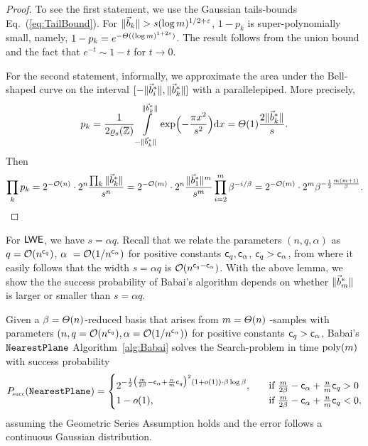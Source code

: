 \begin{proof}
	To see the first statement, we use the Gaussian tails-bounds Eq.~(\ref{eq:TailBound}). For $\| \vec b_k \| > s (\log{m})^{1/2 + \varepsilon}$, $1-p_k$ is super-polynomially small, namely, $1-p_k = e^{-\varTheta((\log{m})^{1+2\varepsilon})}$. The result follows from the union bound and the fact that $e^{-t} \sim 1-t$ for $t \rightarrow 0$. 
	
	For the second statement, informally, we approximate the area under the Bell-shaped curve on the interval $[- \| \vec b^*_i \|, \| \vec b^*_k \|]$ with a parallelepiped. More precisely,
	\[
		p_k = \frac{1}{2 \varrho_s({{\mathbb Z}})}\int\limits_{- \| \vec b^*_k \|}^{ \| \vec b^*_k \|} \exp \Bigl(-\frac{\pi x^2}{s^2} \Bigr) \mathrm{d} x = \varTheta(1) \frac{2 \| \vec b^*_k \|}{s}.
	\]
Then 
	\[
		\prod_k p_k = 2^{-\mathcal{O}(n)} \cdot 2^n \frac{ \prod_k \| \vec b^*_k \|}{s^n} = 2^{-\mathcal{O}(m)} \cdot 2^n  \frac{\|\vec b^*_1\|^m}{s^m} \prod_{i=2}^{m} \beta^{-i/ \beta} = 2^{-\mathcal{O}(m)} \cdot 2^m \beta^{-\frac{1}{2} \frac{m(m+1)}{\beta}}. 
	\]
\end{proof}

For $\textsf{LWE}$, we have $s = \alpha q$. Recall that we relate the \LWE parameters $(n, q, \alpha)$ as $q = \mathcal{O}(n^{\mathsf{c}_q})$, $\alpha~= \mathcal{O}(1 / n^{\mathsf{c}_{\alpha}})$ for positive constants $\mathsf{c}_q, \mathsf{c}_{\alpha} $, $\mathsf{c}_q > \mathsf{c}_{\alpha}$, from where it easily follows that the width $s=\alpha q$ is $ \mathcal{O}(n^{\mathsf{c}_q-\mathsf{c}_{\alpha}})$. With the above lemma, we show the the success probability of Babai's algorithm depends on whether $\|\vec b^*_m \|$ is larger or smaller than $s = \alpha q$. %

\begin{thm} \label{thm:PsuccBabai}
	Given a $\beta = \varTheta(n)$-\BKZ reduced basis that arises from $m = \varTheta(n)$ \LWE-samples with parameters $(n, q=\mathcal{O}(n^{\mathsf{c}_q}), \alpha = \mathcal{O}(1 / n^{\mathsf{c}_{\alpha}}) )$ for positive constants $\mathsf{c}_q>\mathsf{c}_{\alpha}$, Babai's $\texttt{NearestPlane}$ Algorithm~\ref{alg:Babai} solves the Search-\LWE problem in time $\mathrm{poly}(m)$ with success probability
	\begin{equation*}
P\mkern-4mu_{\mbox{\tiny succ}}(\texttt{NearestPlane})=\begin{cases}
                  2^{-\frac{1}{2} \bigl(\frac{m}{2\beta}-\mathsf{c}_{\alpha} + \frac{n}{m} \mathsf{c}_q  \bigr)^2 (1+o(1)) \cdot \beta\log\beta},			      \quad & \text{if }  \frac{m}{2 \beta} - \mathsf{c}_{\alpha} + \frac{n}{m} \mathsf{c}_q  > 0  \\
                  1-o(1),                                     \quad&\text{if } \frac{m}{2 \beta} - \mathsf{c}_{\alpha} + \frac{n}{m}\mathsf{c}_q  < 0,
                  \end{cases}
\end{equation*}
assuming the Geometric Series Assumption holds and the \LWE error follows a continuous Gaussian distribution.
\end{thm}

